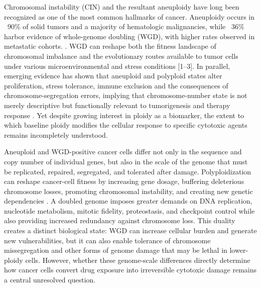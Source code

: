 \documentclass[11pt,notitlepage]{article}
\begin{document}
Chromosomal instability (CIN) and the resultant aneuploidy have long been recognized as one of the most common hallmarks of cancer. Aneuploidy occurs in ~90\% of solid tumors and a majority of hematologic malignancies, while ~36\% harbor evidence of whole-genome doubling (WGD), with higher rates observed in metastatic cohorts.  \cite{quinton_whole-genome_2021,weaver_does_2006}. WGD can reshape both the fitness landscape of chromosomal imbalance and the evolutionary routes available to tumor cells under various microenvironmental and stress conditions \cite{quinton_whole-genome_2021, lopez_interplay_2020, bielski_genome_2018} [1–3]. In parallel, emerging evidence has shown that aneuploid and polyploid states alter proliferation, stress tolerance, immune exclusion and the consequences of chromosome-segregation errors, implying that chromosome-number state is not merely descriptive but functionally relevant to tumorigenesis and therapy response \cite{sheltzer_single-chromosome_2017, thompson_proliferation_2010, santaguida_chromosome_2017}. Yet despite growing interest in ploidy as a biomarker, the extent to which baseline ploidy modifies the cellular response to specific cytotoxic agents remains incompletely understood.

Aneuploid and WGD-positive cancer cells differ not only in the sequence and copy number of individual genes, but also in the scale of the genome that must be replicated, repaired, segregated, and tolerated after damage. Polyploidization can reshape cancer-cell fitness by increasing gene dosage, buffering deleterious chromosome losses, promoting chromosomal instability, and creating new genetic dependencies \cite{zack_pan-cancer_2013, bielski_genome_2018, lopez_interplay_2020, dewhurst_tolerance_2014, kuznetsova_chromosomal_2015, quinton_whole-genome_2021}. A doubled genome imposes greater demands on DNA replication, nucleotide metabolism, mitotic fidelity, proteostasis, and checkpoint control while also providing increased redundancy against chromosome loss. This duality creates a distinct biological state: WGD can increase cellular burden and generate new vulnerabilities, but it can also enable tolerance of chromosome missegregation and other forms of genome damage that may be lethal in lower-ploidy cells. However, whether these genome-scale differences directly determine how cancer cells convert drug exposure into irreversible cytotoxic damage remains a central unresolved question.
\end{document}

